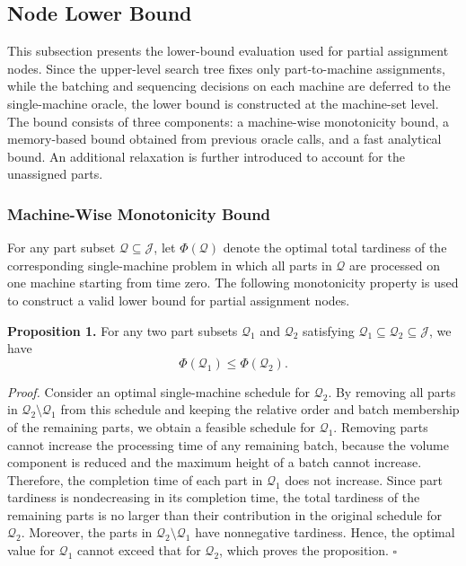 \documentclass[letterpaper, 10 pt, conference]{ieeeconf}  %
\newcounter{proposition}
\begin{document}
\subsection{Node Lower Bound}
\label{subsec:node_lb}

This subsection presents the lower-bound evaluation used for partial
assignment nodes. Since the upper-level search tree fixes only
part-to-machine assignments, while the batching and sequencing decisions on
each machine are deferred to the single-machine oracle, the lower bound is
constructed at the machine-set level. The bound consists of three components:
a machine-wise monotonicity bound, a memory-based bound obtained from
previous oracle calls, and a fast analytical bound. An additional relaxation
is further introduced to account for the unassigned parts.

\subsubsection{Machine-Wise Monotonicity Bound}

For any part subset $\mathcal{Q}\subseteq\mathcal{J}$, let
$\Phi(\mathcal{Q})$ denote the optimal total tardiness of the corresponding
single-machine problem in which all parts in $\mathcal{Q}$ are processed on
one machine starting from time zero. The following monotonicity property is
used to construct a valid lower bound for partial assignment nodes.

\textbf{Proposition 1.}
For any two part subsets $\mathcal{Q}_1$ and $\mathcal{Q}_2$ satisfying
$\mathcal{Q}_1\subseteq \mathcal{Q}_2\subseteq\mathcal{J}$, we have
\[
\Phi(\mathcal{Q}_1)\le \Phi(\mathcal{Q}_2).
\]

\textit{Proof.}
Consider an optimal single-machine schedule for $\mathcal{Q}_2$. By removing
all parts in $\mathcal{Q}_2\setminus\mathcal{Q}_1$ from this schedule and
keeping the relative order and batch membership of the remaining parts, we
obtain a feasible schedule for $\mathcal{Q}_1$. Removing parts cannot
increase the processing time of any remaining batch, because the volume
component is reduced and the maximum height of a batch cannot increase.
Therefore, the completion time of each part in $\mathcal{Q}_1$ does not
increase. Since part tardiness is nondecreasing in its completion time, the
total tardiness of the remaining parts is no larger than their contribution
in the original schedule for $\mathcal{Q}_2$. Moreover, the parts in
$\mathcal{Q}_2\setminus\mathcal{Q}_1$ have nonnegative tardiness. Hence,
the optimal value for $\mathcal{Q}_1$ cannot exceed that for
$\mathcal{Q}_2$, which proves the proposition.
\hfill $\square$
\end{document}
